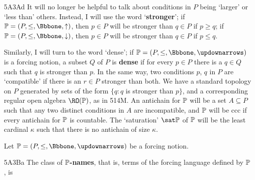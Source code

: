 
\spheader 5A3Ad   It
will no longer be helpful to talk about conditions in $P$ being `larger' or
`less than' others.   Instead, I will use the word `{\bf stronger}';  if
$\Bbb P=(P,\le,\Bbbone,\uparrow)$, then $p\in P$ will be stronger than
$q\in P$ if $p\ge q$;  if
$\Bbb P=(P,\le,\Bbbone,\downarrow)$, then $p\in P$ will be stronger than
$q\in P$ if $p\le q$.

Similarly, I
will turn to the word `dense';  if $\Bbb P=(P,\le,\Bbbone,\updownarrows)$
is a forcing notion, a subset $Q$ of
$P$ is {\bf dense} if for every $p\in P$ there is a $q\in Q$ such that $q$
is stronger than $p$.   In the same way, two
conditions $p$,
$q$ in $P$ are `compatible' if there is an $r\in P$ stronger than both.
We have a standard topology on $P$ generated by sets of
the form
$\{q:q$ is stronger than $p\}$, and a corresponding regular open algebra
$\RO(\Bbb P)$, as in 514M.   An antichain for $\Bbb P$
will be a set $A\subseteq P$ such that any
two distinct conditions in $A$ are incompatible, and
$\Bbb P$ will be ccc if every antichain for $\Bbb P$ is countable.
The `saturation' $\sat\Bbb P$ of $\Bbb P$ will be the least cardinal
$\kappa$ such that there is no antichain of size $\kappa$.

 Let
$\Bbb P=(P,\le,\Bbbone,\updownarrows)$
be a forcing notion.

\spheader 5A3Ba The class of {\bf $\Bbb P$-names}, that is,
terms of the forcing language defined by $\Bbb P$, is

